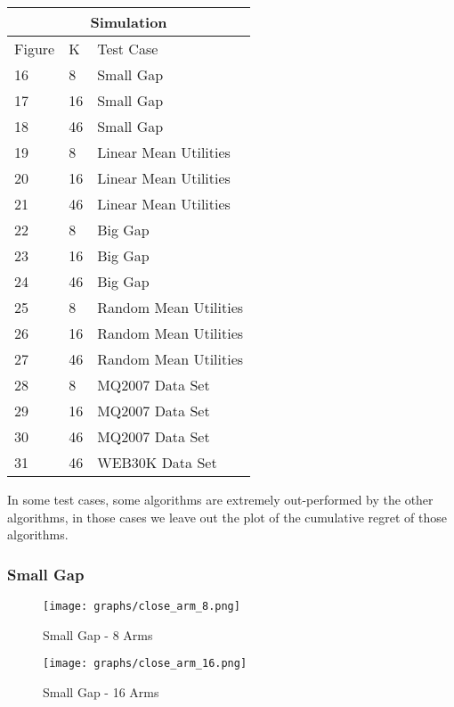 \documentclass{llncs}
\begin{document}
\begin{table}[h!]
\centering
\begin{tabular}{ |p{2cm}|p{2cm}|p{4cm}|  }

\hline
 \multicolumn{3}{|c|}{Simulation} \\
 \hline
   \hline
Figure & K & Test Case \\
\hline
  16     & 8  & Small Gap  \\
  \hline
  17     & 16  &  Small Gap  \\
  \hline
  18     & 46  &  Small Gap  \\
  \hline
  19     & 8  &  Linear Mean Utilities \\
  \hline
  20     & 16  & Linear Mean Utilities  \\
  \hline
  21     & 46  & Linear Mean Utilities  \\
  \hline
  22     & 8  &  Big Gap \\
  \hline
  23     & 16  &  Big Gap \\
  \hline
  24     & 46  &  Big Gap \\

  \hline
  25     & 8  &  Random Mean Utilities  \\
  \hline
  26     & 16  &  Random Mean Utilities  \\
  \hline
  27     & 46  &  Random Mean Utilities  \\
  \hline
  28     & 8  &  MQ2007 Data Set \\
  \hline
  29     & 16  & MQ2007 Data Set  \\
  \hline
  30     & 46  & MQ2007 Data Set  \\
  \hline
  31     & 46  & WEB30K Data Set  \\
  \hline
\end{tabular}
\end{table}
In some test cases, some algorithms are extremely out-performed by the other algorithms, in those cases we leave out the plot of the cumulative regret of those algorithms.

\subsubsection{Small Gap}

\begin{figure}[h!]
\centering
  \texttt{[image: graphs/close\_arm\_8.png]}
  \caption{Small Gap - 8 Arms}
\end{figure}

\begin{figure}[h!]
\centering
  \texttt{[image: graphs/close\_arm\_16.png]}
  \caption{Small Gap - 16 Arms}
\end{figure}
\end{document}
